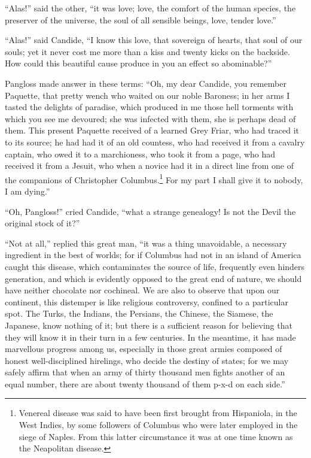 ``Alas!'' said the other, ``it was love; love, the comfort of the human species, the preserver of the universe, the soul of all sensible beings, love, tender love.''

``Alas!'' said Candide, ``I know this love, that sovereign of hearts, that soul of our souls; yet it never cost me more than a kiss and twenty kicks on the backside. How could this beautiful cause produce in you an effect so abominable?''

Pangloss made answer in these terms: ``Oh, my dear Candide, you remember Paquette, that pretty wench who waited on our noble Baroness; in her arms I tasted the delights of paradise, which produced in me those hell torments with which you see me devoured; she was infected with them, she is perhaps dead of them. This present Paquette received of a learned Grey Friar, who had traced it to its source; he had had it of an old countess, who had received it from a cavalry captain, who owed it to a marchioness, who took it from a page, who had received it from a Jesuit, who when a novice had it in a direct line from one of the companions of Christopher Columbus.\footnote{Venereal disease was said to have been first brought from Hispaniola, in the West Indies, by some followers of Columbus who were later employed in the siege of Naples. From this latter circumstance it was at one time known as the Neapolitan disease.} For my part I shall give it to nobody, I am dying.''

``Oh, Pangloss!'' cried Candide, ``what a strange genealogy! Is not the Devil the original stock of it?''

``Not at all,'' replied this great man, ``it was a thing unavoidable, a necessary ingredient in the best of worlds; for if Columbus had not in an island of America caught this disease, which contaminates the source of life, frequently even hinders generation, and which is evidently opposed to the great end of nature, we should have neither chocolate nor cochineal. We are also to observe that upon our continent, this distemper is like religious controversy, confined to a particular spot. The Turks, the Indians, the Persians, the Chinese, the Siamese, the Japanese, know nothing of it; but there is a sufficient reason for believing that they will know it in their turn in a few centuries. In the meantime, it has made marvellous progress among us, especially in those great armies composed of honest well-disciplined hirelings, who decide the destiny of states; for we may safely affirm that when an army of thirty thousand men fights another of an equal number, there are about twenty thousand of them p-x-d on each side.''


